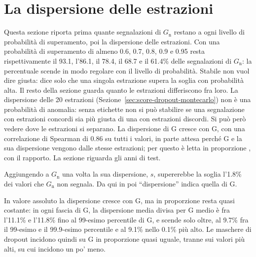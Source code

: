 \section{La dispersione delle estrazioni}
\label{app:dropout-dispersione}

Questa sezione riporta prima quante segnalazioni di $G_{\mathrm{n}}$ restano a ogni livello di probabilità di superamento, poi la dispersione delle estrazioni. Con una probabilità di superamento di almeno 0.6, 0.7, 0.8, 0.9 e 0.95 resta rispettivamente il 93.1, l'86.1, il 78.4, il 68.7 e il 61.4\% delle segnalazioni di $G_{\mathrm{n}}$: la percentuale scende in modo regolare con il livello di probabilità. Stabile non vuol dire giusta: dice solo che una singola estrazione supera la soglia con probabilità alta. Il resto della sezione guarda quanto le estrazioni differiscono fra loro. La dispersione delle 20 estrazioni (Sezione~\ref{sec:score-dropout-montecarlo}) non è una probabilità di anomalia: senza etichette non si può stabilire se una segnalazione con estrazioni concordi sia più giusta di una con estrazioni discordi. Si può però vedere dove le estrazioni si separano. La dispersione di G cresce con G, con una correlazione di Spearman di 0.86 su tutti i valori, in parte attesa perché G e la sua dispersione vengono dalle stesse estrazioni; per questo è letta in proporzione%
, con il rapporto. La sezione riguarda gli anni di test.


Aggiungendo a $G_{\mathrm{n}}$ una volta la sua dispersione, $s$, supererebbe la soglia l'1.8\% dei valori che $G_{\mathrm{n}}$ non segnala. Da qui in poi ``dispersione'' indica quella di G.

In valore assoluto la dispersione cresce con G, ma in proporzione resta quasi costante: in ogni fascia di G, la dispersione media divisa per G medio è fra l'11.1\% e l'11.8\% fino al 99-esimo percentile di G, e scende solo oltre, al 9.7\% fra il 99-esimo e il 99.9-esimo percentile e al 9.1\% nello 0.1\% più alto. Le maschere di dropout incidono quindi su G in proporzione quasi uguale, tranne sui valori più alti, su cui incidono un po' meno.


